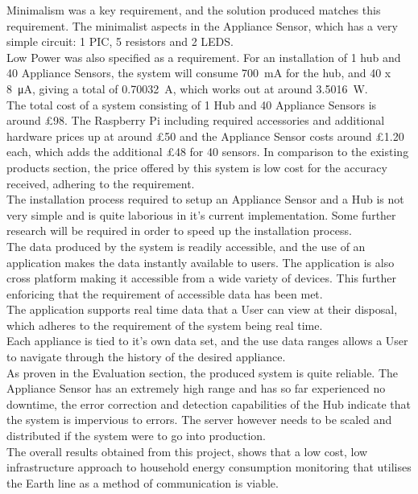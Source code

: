 \documentclass[draft,preprint,12pt,3p]{elsarticle}
\begin{document}
Minimalism was a key requirement, and the solution produced matches this requirement. The minimalist aspects in the Appliance Sensor, which has a very simple circuit: 1 PIC, 5 resistors and 2 LEDS.\\
Low Power was also specified as a requirement. For an installation of 1 hub and 40 Appliance Sensors, the system will consume \SI{700}{\milli\ampere} for the hub, and 40 x \SI{8}{\micro\ampere}, giving a total of \SI{0.70032}{\ampere}, which works out at around \SI{3.5016}{\watt}.\\
The total cost of a system consisting of 1 Hub and 40 Appliance Sensors is around \pounds98. The Raspberry Pi including required accessories and additional hardware prices up at around \pounds50 and the Appliance Sensor costs around \pounds1.20 each, which adds the additional \pounds48 for 40 sensors. In comparison to the existing products section, the price offered by this system is low cost for the accuracy received, adhering to the requirement.\\
The installation process required to setup an Appliance Sensor and a Hub is not very simple and is quite laborious in it's current implementation. Some further research will be required in order to speed up the installation process.\\
The data produced by the system is readily accessible, and the use of an application makes the data instantly available to users. The application is also cross platform making it accessible from a wide variety of devices. This further enforicing that the requirement of accessible data has been met.\\
The application supports real time data that a User can view at their disposal, which adheres to the requirement of the system being real time.\\
Each appliance is tied to it's own data set, and the use data ranges allows a User to navigate through the history of the desired appliance.\\
As proven in the Evaluation section, the produced system is quite reliable. The Appliance Sensor has an extremely high range and has so far experienced no downtime, the error correction and detection capabilities of the Hub indicate that the system is impervious to errors. The server however needs to be scaled and distributed if the system were to go into production.\\
The overall results obtained from this project, shows that a low cost, low infrastructure approach to household energy consumption monitoring that utilises the Earth line as a method of communication is viable.
\end{document}
